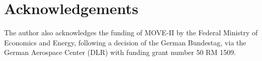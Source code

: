 \cleardoublepage
\section*{Acknowledgements}

The author also acknowledges the funding of MOVE-II by the Federal Ministry of Economics and Energy, following a decision of the German Bundestag, via the German Aerospace Center (DLR) with funding grant number 50 RM 1509.
